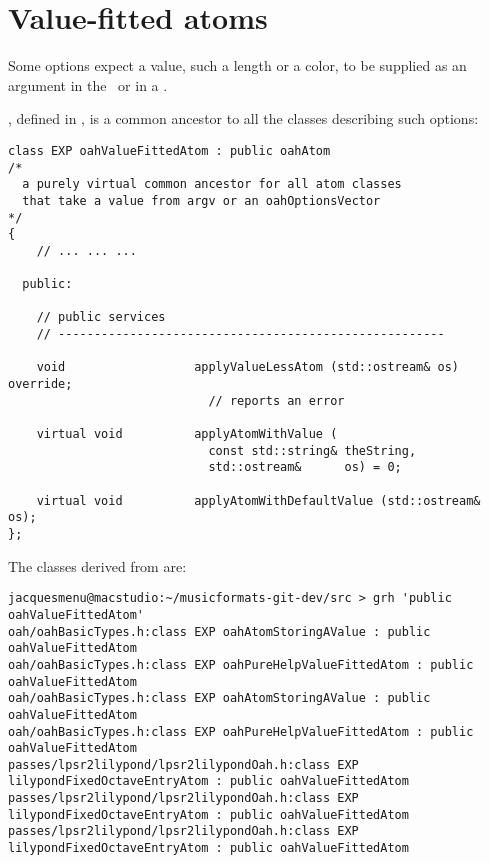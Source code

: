 \section{Value-fitted atoms}

Some options expect a value, such a length or a color, to be supplied as an argument in the \CLI\ or in a .

, defined in , is a common ancestor to all the classes describing such options:
\begin{lstlisting}[language=CPlusPlus]
class EXP oahValueFittedAtom : public oahAtom
/*
  a purely virtual common ancestor for all atom classes
  that take a value from argv or an oahOptionsVector
*/
{
	// ... ... ...

  public:

    // public services
    // ------------------------------------------------------

    void                  applyValueLessAtom (std::ostream& os) override;
                            // reports an error

    virtual void          applyAtomWithValue (
                            const std::string& theString,
                            std::ostream&      os) = 0;

    virtual void          applyAtomWithDefaultValue (std::ostream& os);
};
\end{lstlisting}

The classes derived from  are:
\begin{lstlisting}[language=TerminalSmall]
jacquesmenu@macstudio:~/musicformats-git-dev/src > grh 'public oahValueFittedAtom'
oah/oahBasicTypes.h:class EXP oahAtomStoringAValue : public oahValueFittedAtom
oah/oahBasicTypes.h:class EXP oahPureHelpValueFittedAtom : public oahValueFittedAtom
oah/oahBasicTypes.h:class EXP oahAtomStoringAValue : public oahValueFittedAtom
oah/oahBasicTypes.h:class EXP oahPureHelpValueFittedAtom : public oahValueFittedAtom
passes/lpsr2lilypond/lpsr2lilypondOah.h:class EXP lilypondFixedOctaveEntryAtom : public oahValueFittedAtom
passes/lpsr2lilypond/lpsr2lilypondOah.h:class EXP lilypondFixedOctaveEntryAtom : public oahValueFittedAtom
passes/lpsr2lilypond/lpsr2lilypondOah.h:class EXP lilypondFixedOctaveEntryAtom : public oahValueFittedAtom
\end{lstlisting}

